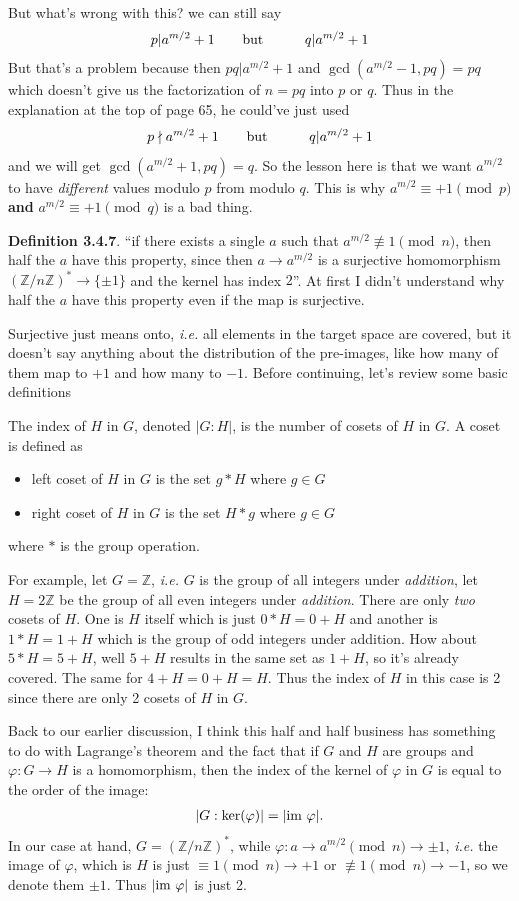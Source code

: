 \documentclass[aps,preprint,preprintnumbers,nofootinbib,showpacs,prd]{revtex4-1}
\newcommand{\ie}{{\it i.e.} }
\newcommand{\bit}{\begin{itemize}}
\newcommand{\eit}{\end{itemize}}
\newcommand{\nbea}{\begin{eqnarray*}}
\newcommand{\neea}{\end{eqnarray*}}
\begin{document}
But what's wrong with this? we can still say
%
\nbea
p | a^{m/2} + 1 &~~~~~~{\rm but}~~~~~~& q | a^{m/2} + 1
\neea
%
But that's a problem because then $pq | a^{m/2} + 1$ and $\gcd(a^{m/2}-1, pq) = pq$ which doesn't give us the factorization of $n = pq$ into $p$ or $q$. Thus in the explanation at the top of page 65, he could've just used 
%
\nbea
p \nmid a^{m/2} + 1 &~~~~~~{\rm but}~~~~~~& q | a^{m/2} + 1
\neea
%
and we will get $\gcd(a^{m/2} + 1, pq) = q$. So the lesson here is that we want $a^{m/2}$ to have {\it different} values modulo $p$ from modulo $q$. This is why $a^{m/2} \equiv +1 \pmod{p}$ {\bf and} $a^{m/2} \equiv +1 \pmod{q}$ is a bad thing.

{\bf Definition 3.4.7}. ``if there exists a single $a$ such that $a^{m/2} \not\equiv 1 \pmod{n}$, then half the $a$ have this property, since then $a \to a^{m/2}$ is a surjective homomorphism $(\mathbb{Z}/n\mathbb{Z})^* \to \{\pm1\}$ and the kernel has index $2$''. At first I didn't understand why half the $a$ have this property even if the map is surjective.

Surjective just means onto, \ie all elements in the target space are covered, but it doesn't say anything about the distribution of the pre-images, like how many of them map to $+1$ and how many to $-1$. Before continuing, let's review some basic definitions

The index of $H$ in $G$, denoted $|G:H|$, is the number of cosets of $H$ in $G$. A coset is defined as
%
\bit
\item left coset of $H$ in $G$ is the set $g * H$ where $g \in G$
\item right coset of $H$ in $G$ is the set $H * g$ where $g \in G$
\eit
%
where $*$ is the group operation.

For example, let $G = \mathbb{Z}$, \ie $G$ is the group of all integers under {\it addition}, let $H = 2\mathbb{Z}$ be the group of all even integers under {\it addition}. There are only {\it two} cosets of $H$. One is $H$ itself which is just $ 0 * H = 0 + H$ and another is $1 * H = 1 + H$ which is the group of odd integers under addition. How about $5 * H = 5 + H$, well $5 + H$ results in the same set as $1 + H$, so it's already covered. The same for $4 + H = 0 + H = H$. Thus the index of $H$ in this case is 2 since there are only 2 cosets of $H$ in $G$.

Back to our earlier discussion, I think this half and half business has something to do with Lagrange's theorem and the fact that if $G$ and $H$ are groups and $\varphi: G \to H$ is a homomorphism, then the index of the kernel of $\varphi$ in $G$ is equal to the order of the image:
%
\nbea
|G:\ker(\varphi)|=|{\rm im~}\varphi|.
\neea
%
In our case at hand, $G = (\mathbb{Z}/n\mathbb{Z})^*$, while $\varphi: a \to a^{m/2} \pmod{n} \to \pm1$, \ie the image of $\varphi$, which is $H$ is just $ \equiv 1 \pmod{n} \to +1$ or $\not\equiv 1 \pmod{n} \to -1$, so we denote them $\pm1$. Thus $|{\rm im~}\varphi|$ is just 2.
\end{document}
